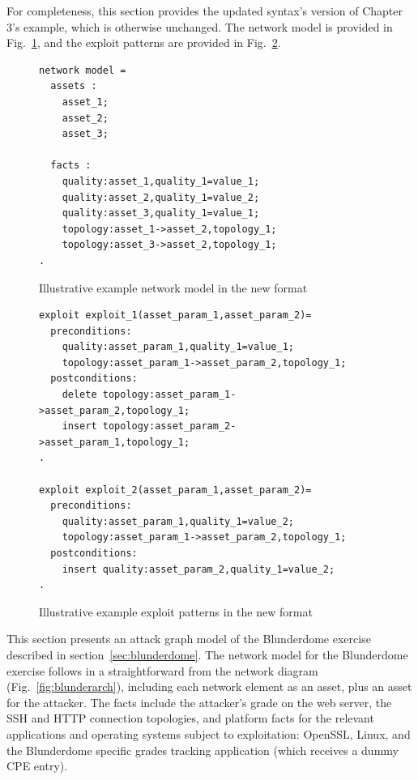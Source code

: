For completeness, this section provides the updated syntax's version of
Chapter 3's example, which is otherwise unchanged. The network model is
provided in Fig.~\ref{fig:ill_updated_nm}, and the exploit patterns are
provided in Fig.~\ref{fig:ill_updated_xp}.

\begin{figure}
\begin{lstlisting}
network model = 
  assets :
    asset_1;
    asset_2;
    asset_3;

  facts :
    quality:asset_1,quality_1=value_1;
    quality:asset_2,quality_1=value_2;
    quality:asset_3,quality_1=value_1;
    topology:asset_1->asset_2,topology_1;
    topology:asset_3->asset_2,topology_1;
.
\end{lstlisting}
\caption{Illustrative example network model in the new format}
\label{fig:ill_updated_nm}
\end{figure}

\begin{figure}
\begin{lstlisting}
exploit exploit_1(asset_param_1,asset_param_2)=
  preconditions:
    quality:asset_param_1,quality_1=value_1;
    topology:asset_param_1->asset_param_2,topology_1;
  postconditions:
    delete topology:asset_param_1->asset_param_2,topology_1;
    insert topology:asset_param_2->asset_param_1,topology_1;
.

exploit exploit_2(asset_param_1,asset_param_2)=
  preconditions:
    quality:asset_param_1,quality_1=value_2;
    topology:asset_param_1->asset_param_2,topology_1;
  postconditions:
    insert quality:asset_param_2,quality_1=value_2;
.
\end{lstlisting}
\caption{Illustrative example exploit patterns in the new format}
\label{fig:ill_updated_xp}
\end{figure}

This section presents an attack graph model of the Blunderdome exercise
described in section~\ref{sec:blunderdome}.
The network model for the Blunderdome exercise follows in a straightforward
from the network diagram (Fig.~\ref{fig:blunderarch}), including each network
element as an asset, plus an asset for the attacker. The facts include the
attacker's grade on the web server, the SSH and HTTP connection topologies,
and platform facts for the relevant applications and operating systems subject
to exploitation: OpenSSL, Linux, and the Blunderdome specific grades tracking
application (which receives a dummy CPE entry).


